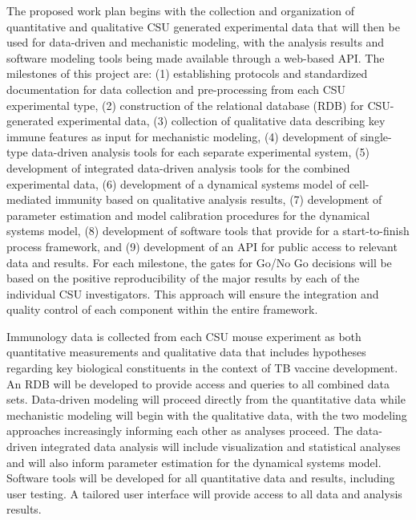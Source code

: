 \documentclass[]{book}
\begin{document}
The proposed work plan begins with the collection and organization of
quantitative and qualitative CSU generated experimental data that will
then be used for data-driven and mechanistic modeling, with the analysis
results and software modeling tools being made available through a
web-based API. The milestones of this project are: (1) establishing
protocols and standardized documentation for data collection and
pre-processing from each CSU experimental type, (2) construction of the
relational database (RDB) for CSU-generated experimental data, (3)
collection of qualitative data describing key immune features as input
for mechanistic modeling, (4) development of single-type data-driven
analysis tools for each separate experimental system, (5) development of
integrated data-driven analysis tools for the combined experimental
data, (6) development of a dynamical systems model of cell-mediated
immunity based on qualitative analysis results, (7) development of
parameter estimation and model calibration procedures for the dynamical
systems model, (8) development of software tools that provide for a
start-to-finish process framework, and (9) development of an API for
public access to relevant data and results. For each milestone, the
gates for Go/No Go decisions will be based on the positive
reproducibility of the major results by each of the individual CSU
investigators. This approach will ensure the integration and quality
control of each component within the entire framework.

Immunology data is collected from each CSU mouse experiment as both
quantitative measurements and qualitative data that includes hypotheses
regarding key biological constituents in the context of TB vaccine
development. An RDB will be developed to provide access and queries to
all combined data sets. Data-driven modeling will proceed directly from
the quantitative data while mechanistic modeling will begin with the
qualitative data, with the two modeling approaches increasingly
informing each other as analyses proceed. The data-driven integrated
data analysis will include visualization and statistical analyses and
will also inform parameter estimation for the dynamical systems model.
Software tools will be developed for all quantitative data and results,
including user testing. A tailored user interface will provide access to
all data and analysis results.
\end{document}
